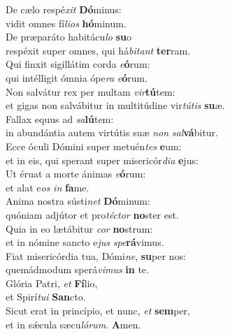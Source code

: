 \evenverse De cælo respé\textit{xit} \textbf{Dó}minus:~\*\\
\evenverse vidit omnes fí\textit{li}\textit{os} \textbf{hó}minum.\\
\oddverse De præparáto habitácu\textit{lo} \textbf{su}o~\*\\
\oddverse respéxit super omnes, qui há\textit{bi}\textit{tant} \textbf{ter}ram.\\
\evenverse Qui finxit sigillátim corda \textit{e}\textbf{ó}rum:~\*\\
\evenverse qui intélligit ómnia ópe\textit{ra} \textit{e}\textbf{ó}rum.\\
\oddverse Non salvátur rex per multam \textit{vir}\textbf{tú}tem:~\*\\
\oddverse et gigas non salvábitur in multitúdine vir\textit{tú}\textit{tis} \textbf{su}æ.\\
\evenverse Fallax equus ad \textit{sa}\textbf{lú}tem:~\*\\
\evenverse in abundántia autem virtútis suæ \textit{non} \textit{sal}\textbf{vá}bitur.\\
\oddverse Ecce óculi Dómini super metuén\textit{tes} \textbf{e}um:~\*\\
\oddverse et in eis, qui sperant super misericór\textit{di}\textit{a} \textbf{e}jus:\\
\evenverse Ut éruat a morte ánimas \textit{e}\textbf{ó}rum:~\*\\
\evenverse et alat e\textit{os} \textit{in} \textbf{fa}me.\\
\oddverse Anima nostra sústi\textit{net} \textbf{Dó}minum:~\*\\
\oddverse quóniam adjútor et pro\textit{té}\textit{ctor} \textbf{no}ster est.\\
\evenverse Quia in eo lætábitur \textit{cor} \textbf{no}strum:~\*\\
\evenverse et in nómine sancto e\textit{jus} \textit{spe}\textbf{rá}vimus.\\
\oddverse Fiat misericórdia tua, Dómi\textit{ne}, \textbf{su}per nos:~\*\\
\oddverse quemádmodum sperá\textit{vi}\textit{mus} \textbf{in} te.\\
\evenverse Glória Patri, \textit{et} \textbf{Fí}lio,~\*\\
\evenverse et Spirí\textit{tu}\textit{i} \textbf{San}cto.\\
\oddverse Sicut erat in princípio, et nunc, \textit{et} \textbf{sem}per,~\*\\
\oddverse et in sǽcula sæcu\textit{ló}\textit{rum}. \textbf{A}men.\\
